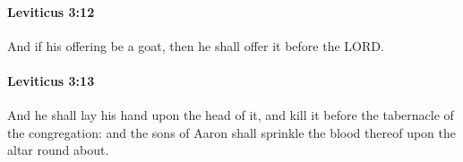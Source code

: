 		\paragraph{Leviticus 3:12} %
			\label{LEVITICUS-3-12}

			And if his offering be a goat, then he shall offer it before the LORD.


		\paragraph{Leviticus 3:13} %
			\label{LEVITICUS-3-13}

			And he shall lay his hand upon the head of it, and kill it before the tabernacle of the congregation: and the sons of Aaron shall sprinkle the blood thereof upon the altar round about.


